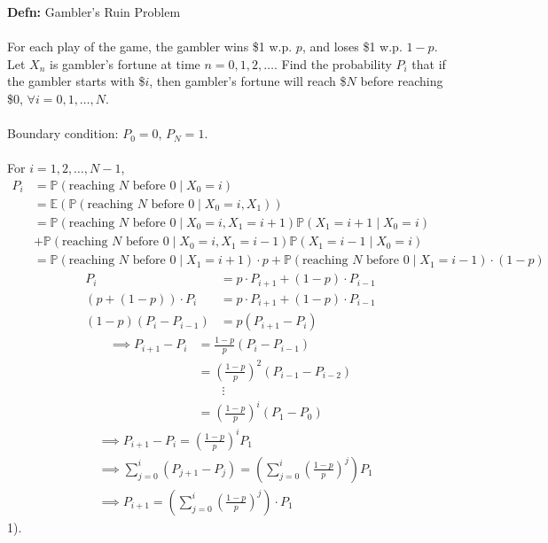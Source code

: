 \documentclass[a4paper]{article}
\newcommand{\n}{\hfill\break}
\newcommand{\defn}[1]{\par\noindent\settowidth{\hangindent}{\textbf{Defn: }}\textbf{Defn: }#1\n}
\newcommand{\Prob}{\mathbb{P}}
\renewcommand{\P}{\Prob}
\newcommand{\Avg}{\mathbb{E}}
\newcommand{\E}{\Avg}
\begin{document}
\defn{
    Gambler's Ruin Problem
    \\\\
    For each play of the game, the gambler wins \$1 w.p. $p$, and loses \$1 w.p. $1-p$. Let $X_n$ is gambler's fortune at time $n=0,1,2,\dots$. Find the probability $P_i$ that if the gambler starts with \$$i$, then gambler's fortune will reach \$$N$ before reaching \$0, $\forall i=0,1,\dots,N$.
    \\\\
    Boundary condition: $P_0=0$, $P_N=1$.
    \\\\
    For $i=1,2,\dots, N-1$,
    \begin{align*}
        P_i&=\P(\text{reaching $N$ before 0}\mid X_0=i) \\
        &=\E(\P(\text{reaching $N$ before 0}\mid X_0=i, X_1)) \\
        &=\P(\text{reaching $N$ before 0}\mid X_0=i, X_1=i+1)\P(X_1=i+1\mid X_0=i) \\
        &+\P(\text{reaching $N$ before 0}\mid X_0=i, X_1=i-1)\P(X_1=i-1\mid X_0=i) \\
        &=\P(\text{reaching $N$ before 0}\mid X_1=i+1)\cdot p+\P(\text{reaching $N$ before 0}\mid X_1=i-1)\cdot(1-p)
    \end{align*}
    \begin{align*}
        P_i&=p\cdot P_{i+1}+(1-p)\cdot P_{i-1} \\
        (p+(1-p))\cdot P_i&=p\cdot P_{i+1}+(1-p)\cdot P_{i-1} \\
        (1-p)(P_i-P_{i-1})&=p(P_{i+1}-P_i)
    \end{align*}
    \begin{align*}
        \implies P_{i+1}-P_i&=\frac{1-p}{p}(P_i-P_{i-1}) \\
        &=\left(\frac{1-p}{p}\right)^2(P_{i-1}-P_{i-2}) \\
        &\qquad\vdots \\
        &=\left(\frac{1-p}{p}\right)^i(P_1-P_0)
    \end{align*}
    \begin{align*}
        &\implies P_{i+1}-P_i=\left(\frac{1-p}{p}\right)^i P_1 \\
        &\implies\sum^i_{j=0}(P_{j+1}-P_j)=\left(\sum^i_{j=0}\left(\frac{1-p}{p}\right)^j\right) P_1 \\
        &\implies P_{i+1}=\left(\sum^i_{j=0}\left(\frac{1-p}{p}\right)^j\right)\cdot P_1
    \end{align*}
    1). 
}
\end{document}

